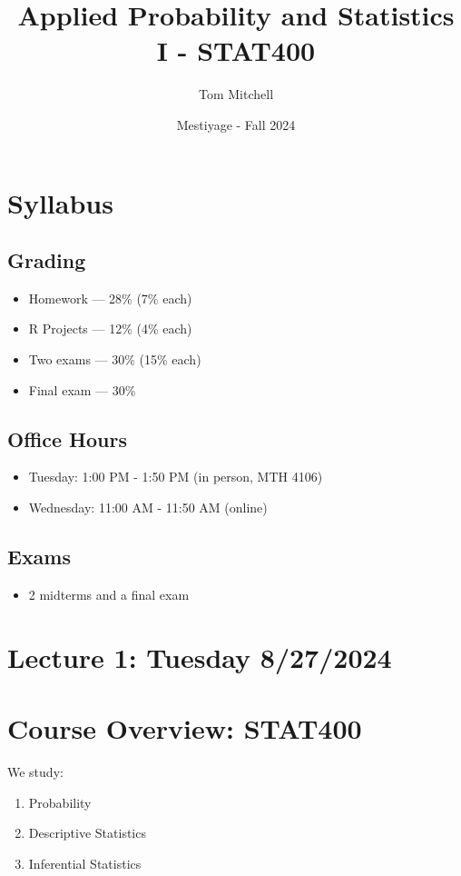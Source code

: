 \documentclass{article}
\title{Applied Probability and Statistics I - STAT400}
\author{Tom Mitchell}
\date{Mestiyage - Fall 2024}
\begin{document}
\maketitle

\section*{Syllabus}

\subsection*{Grading}
\begin{itemize}
    \item Homework — 28\% (7\% each)
    \item R Projects — 12\% (4\% each)
    \item Two exams — 30\% (15\% each)
    \item Final exam — 30\%
\end{itemize}

\subsection*{Office Hours}
\begin{itemize}
    \item Tuesday: 1:00 PM - 1:50 PM (in person, MTH 4106)
    \item Wednesday: 11:00 AM - 11:50 AM (online)
\end{itemize}

\subsection*{Exams}
\begin{itemize}
    \item 2 midterms and a final exam
\end{itemize}

\section*{Lecture 1: Tuesday 8/27/2024}

\section*{Course Overview: STAT400}
We study:
\begin{enumerate}
    \item Probability
    \item Descriptive Statistics
    \item Inferential Statistics
\end{enumerate}
\end{document}
